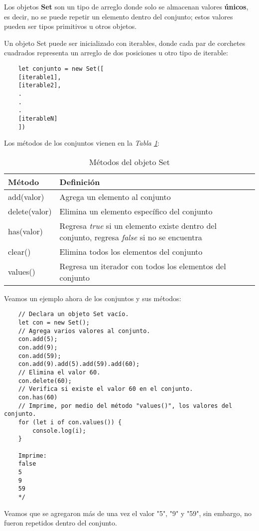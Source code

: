 Los objetos \textbf{Set} son un tipo de arreglo donde solo se almacenan valores \textbf{únicos}, es decir, no se puede repetir un elemento dentro del conjunto; estos valores pueden ser tipos primitivos u otros objetos.

Un objeto Set puede ser inicializado con iterables, donde cada par de corchetes cuadrados representa un arreglo de dos posiciones u otro tipo de iterable:
\begin{lstlisting}
    let conjunto = new Set([
    [iterable1],
    [iterable2],
    .
    .
    .
    [iterableN]
    ])
\end{lstlisting}

Los métodos de los conjuntos vienen en la \textit{Tabla \ref{tab: 13}}:
\begin{table}[H]
    \begin{center}
        \caption{Métodos del objeto Set}
        \label{tab: 13}
        \begin{tabular}{m{3cm} m{10cm}}
            \hline
            \textbf{Método} & \textbf{Definición} \\
            \hline
            add(valor)      & Agrega un elemento al conjunto \\
            delete(valor)   & Elimina un elemento específico del conjunto \\
            has(valor)      & Regresa \textit{true} si un elemento existe dentro del conjunto, regresa \textit{false} si no se encuentra \\
            clear()         & Elimina todos los elementos del conjunto \\
            values()        & Regresa un iterador con todos los elementos del conjunto \\
            \hline
        \end{tabular}
    \end{center}    
\end{table}

Veamos un ejemplo ahora de los conjuntos y sus métodos:
\begin{lstlisting}
    // Declara un objeto Set vacío.
    let con = new Set();
    // Agrega varios valores al conjunto.
    con.add(5);
    con.add(9);
    con.add(59);
    con.add(9).add(5).add(59).add(60);
    // Elimina el valor 60.
    con.delete(60);
    // Verifica si existe el valor 60 en el conjunto.
    con.has(60)
    // Imprime, por medio del método "values()", los valores del conjunto.
    for (let i of con.values()) {
        console.log(i);
    }
    
    Imprime:
    false
    5
    9
    59
    */
\end{lstlisting}

Veamos que se agregaron más de una vez el valor "5", "9" y "59", sin embargo, no fueron repetidos dentro del conjunto.